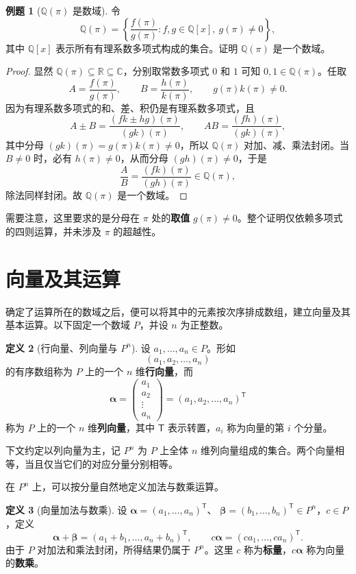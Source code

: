 \documentclass[UTF8, fontset=fandol, a4paper, 12pt]{ctexart}
\newcommand{\Q}{\mathbb{Q}}
\newcommand{\R}{\mathbb{R}}
\newcommand{\C}{\mathbb{C}}
\theoremstyle{definition}
\newtheorem{definition}{定义}[section]
\newtheorem{example}[definition]{例题}
\begin{document}
\begin{example}[$\Q(\pi)$ 是数域]
令
\[
  \Q(\pi)=\left\{
    \frac{f(\pi)}{g(\pi)}:
    f,g\in\Q[x],\ g(\pi)\ne0
  \right\},
\]
其中 $\Q[x]$ 表示所有有理系数多项式构成的集合。证明 $\Q(\pi)$ 是一个数域。
\end{example}
\begin{proof}
显然 $\Q(\pi)\subseteq\R\subseteq\C$，分别取常数多项式 $0$ 和 $1$ 可知 $0,1\in\Q(\pi)$。任取
\[
  A=\frac{f(\pi)}{g(\pi)},\qquad
  B=\frac{h(\pi)}{k(\pi)},
  \qquad g(\pi)k(\pi)\ne0.
\]
因为有理系数多项式的和、差、积仍是有理系数多项式，且
\[
  A\pm B=\frac{(fk\pm hg)(\pi)}{(gk)(\pi)},
  \qquad AB=\frac{(fh)(\pi)}{(gk)(\pi)},
\]
其中分母 $(gk)(\pi)=g(\pi)k(\pi)\ne0$，所以 $\Q(\pi)$ 对加、减、乘法封闭。当 $B\ne0$ 时，必有 $h(\pi)\ne0$，从而分母 $(gh)(\pi)\ne0$，于是
\[
  \frac AB=\frac{(fk)(\pi)}{(gh)(\pi)}\in\Q(\pi),
\]
除法同样封闭。故 $\Q(\pi)$ 是一个数域。
\end{proof}

需要注意，这里要求的是分母在 $\pi$ 处的\textbf{取值} $g(\pi)\ne0$。整个证明仅依赖多项式的四则运算，并未涉及 $\pi$ 的超越性。

\section{向量及其运算}

确定了运算所在的数域之后，便可以将其中的元素按次序排成数组，建立向量及其基本运算。以下固定一个数域 $P$，并设 $n$ 为正整数。

\begin{definition}[行向量、列向量与 $P^n$]
设 $a_1,\ldots,a_n\in P$。形如
\[
  (a_1,a_2,\ldots,a_n)
\]
的有序数组称为 $P$ 上的一个 $n$ 维\textbf{行向量}，而
\[
  \boldsymbol\alpha=
  \begin{pmatrix}a_1\\a_2\\\vdots\\a_n\end{pmatrix}
  =(a_1,a_2,\ldots,a_n)^{\mathsf T}
\]
称为 $P$ 上的一个 $n$ 维\textbf{列向量}，其中 $\mathsf T$ 表示转置，$a_i$ 称为向量的第 $i$ 个分量。

下文约定以列向量为主，记 $P^n$ 为 $P$ 上全体 $n$ 维列向量组成的集合。两个向量相等，当且仅当它们的对应分量分别相等。
\end{definition}

在 $P^n$ 上，可以按分量自然地定义加法与数乘运算。

\begin{definition}[向量加法与数乘]
设 $\boldsymbol\alpha=(a_1,\ldots,a_n)^{\mathsf T}$、
$\boldsymbol\beta=(b_1,\ldots,b_n)^{\mathsf T}\in P^n$，$c\in P$，定义
\[
  \boldsymbol\alpha+\boldsymbol\beta
    =(a_1+b_1,\ldots,a_n+b_n)^{\mathsf T},
  \qquad
  c\boldsymbol\alpha=(ca_1,\ldots,ca_n)^{\mathsf T}.
\]
由于 $P$ 对加法和乘法封闭，所得结果仍属于 $P^n$。这里 $c$ 称为\textbf{标量}，$c\boldsymbol\alpha$ 称为向量的\textbf{数乘}。
\end{definition}
\end{document}
